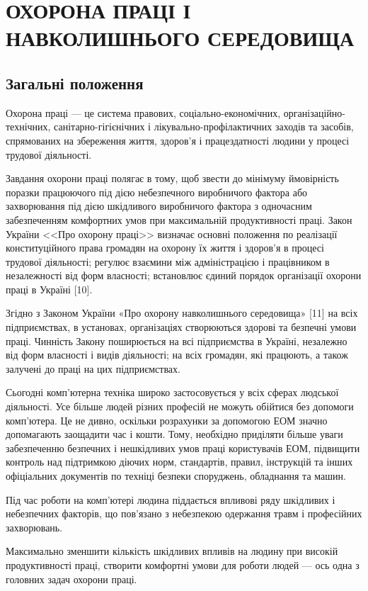 \section{ОХОРОНА ПРАЦІ І НАВКОЛИШНЬОГО СЕРЕДОВИЩА}
\subsection{Загальні положення}
Охорона праці --- це система правових, соціально-економічних, організаційно-технічних, санітарно-гігієнічних і лікувально-профілактичних заходів та засобів, спрямованих на збереження життя, здоров’я і працездатності людини у процесі трудової діяльності.

Завдання охорони праці полягає в тому, щоб звести до мінімуму ймовірність поразки працюючого під дією небезпечного виробничого фактора або захворювання під дією шкідливого виробничого фактора з одночасним забезпеченням комфортних умов при максимальній продуктивності праці. Закон України <<Про охорону праці>> визначає основні положення по реалізації конституційного права громадян на охорону їх життя і здоров'я в процесі трудової діяльності; регулює взаємини між адміністрацією і працівником в незалежності від форм власності; встановлює єдиний порядок організації охорони праці в Україні [10]. %

Згідно з Законом України «Про охорону навколишнього середовища» [11] на всіх підприємствах, в установах, організаціях створюються здорові та безпечні умови праці. Чинність Закону поширюється на всі підприємства в Україні, незалежно від форм власності і видів діяльності; на всіх громадян, які працюють, а також залучені до праці на цих підприємствах. %

Сьогодні комп’ютерна техніка широко застосовується у всіх сферах людської діяльності. Усе більше людей різних професій не можуть обійтися без допомоги комп’ютера. Це не дивно, оскільки розрахунки за допомогою ЕОМ значно допомагають заощадити час і кошти. Тому, необхідно приділяти більше уваги забезпеченню безпечних і нешкідливих умов праці користувачів ЕОМ, підвищити контроль над підтримкою діючих норм, стандартів, правил, інструкцій та інших офіціальних документів по техніці безпеки споруджень, обладнання та машин.

Під час роботи на комп’ютері людина піддається впливові ряду шкідливих і небезпечних факторів, що пов’язано з небезпекою одержання травм і професійних захворювань.

Максимально зменшити кількість шкідливих впливів на людину при високій продуктивності праці, створити комфортні умови для роботи людей --- ось одна з головних задач охорони праці.

